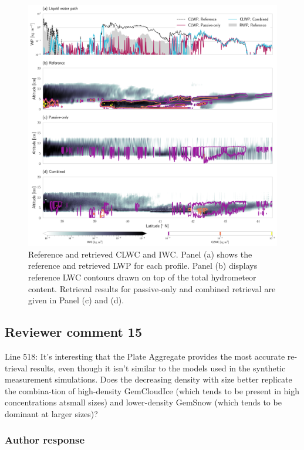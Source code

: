 \begin{figure}
\centering
\includegraphics[width = \textwidth]{../plots/results_cw_b_LargePlateAggregate}
\caption{Reference and retrieved CLWC and IWC. Panel (a) shows the reference and
  retrieved LWP for each profile. Panel (b) displays reference LWC contours
  drawn on top of the total hydrometeor content. Retrieval results for
  passive-only and combined retrieval are given in Panel (c) and (d).}
\label{fig:results_cw_b}
\end{figure}

\subsection*{Reviewer comment 15}

 Line 518: It’s interesting that the Plate Aggregate provides the most accurate
 re-trieval results, even though it isn’t similar to the models used in the
 synthetic measurement simulations. Does the decreasing density with size
 better replicate the combina-tion of high-density GemCloudIce (which tends to
 be present in high concentrations atsmall sizes) and lower-density GemSnow
 (which tends to be dominant at larger sizes)?

\subsubsection*{Author response}

